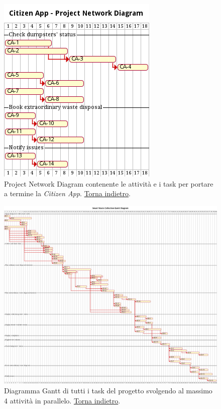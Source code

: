 \begin{figure}[H]
    \centering
    \includegraphics[width=\textwidth]{img/gantt-citizen-app.pm}
    \caption{Project Network Diagram contenente le attività e i task per portare a termine la \textit{Citizen App}. \hyperlink{back:gantt-citizen-app}{Torna indietro}.}
    \label{fig:gantt-citizen-app}
\end{figure}

\begin{figure}[H]
    \centering
    \includegraphics[width=\textwidth]{img/gantt.pm}
    \caption{Diagramma Gantt di tutti i task del progetto svolgendo al massimo 4 attività in parallelo.  \hyperlink{back:gantt}{Torna indietro}.}
    \label{fig:gantt}
\end{figure}


